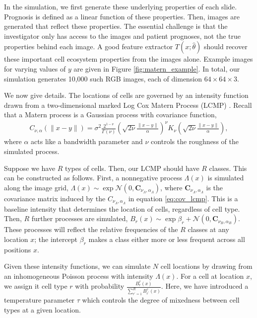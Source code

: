 In the simulation, we first generate these underlying properties of each slide.
Prognosis is defined as a linear function of these properties. Then, images are
generated that reflect these properties. The essential challenge is that the
investigator only has access to the images and patient prognoses, not the true
properties behind each image. A good feature extractor $T\left(x;
\hat{\theta}\right)$ should recover these important cell ecosystem properties
from the images alone. Example images for varying values of $y$ are given in
Figure \ref{fig:matern_example}. In total, our simulation generates 10,000 such
RGB images, each of dimension $64 \times 64 \times 3$.

We now give details. The locations of cells are governed by an intensity
function drawn from a two-dimensional marked Log Cox Matern Process (LCMP)
\cite{diggle2013spatial}. Recall that a Matern process is a Gaussian process
with covariance function,
\begin{align}
  \label{eq:cov_lcmp}
C_{\nu, \alpha}(\|x - y\|)=\sigma^{2} \frac{2^{1-\nu}}{\Gamma(\nu)}\left(\sqrt{2 \nu} \frac{\|x - y\|}{\alpha}\right)^{\nu} K_{\nu}\left(\sqrt{2 \nu} \frac{\|x - y\|}{\alpha}\right),
\end{align}
where $\alpha$ acts like a bandwidth parameter and $\nu$ controls the roughness
of the simulated process.

Suppose we have $R$ types of cells. Then, our LCMP should have $R$ classes. This
can be constructed as follows. First, a nonnegative process
$\Lambda\left(x\right)$ is simulated along the image grid,
$\Lambda\left(x\right) \sim \exp{\mathcal{N}\left(0, \mathbf{C}_{\nu_{\Lambda},
    \alpha_{\Lambda}}\right)}$, where $\mathbf{C}_{\nu_{\Lambda},
  \alpha_{\Lambda}}$ is the covariance matrix induced by the $C_{\nu_{\Lambda},
  \alpha_{\Lambda}}$ in equation \ref{eq:cov_lcmp}. This is a baseline intensity
that determines the location of cells, regardless of cell type. Then, $R$
further processes are simulated, $B_{r}\left(x\right) \sim \exp{\beta_{r} +
  \mathcal{N}\left(0, \mathbf{C}_{\nu_{B}, \alpha_{B}}\right)} $. These
processes will reflect the relative frequencies of the $R$ classes at any
location $x$; the intercept $\beta_r$ makes a class either more or less frequent
across all positions $x$.

Given these intensity functions, we can simulate $N$ cell locations by drawing
from an inhomogeneous Poisson process with intensity $\Lambda\left(x\right)$.
For a cell at location $x$, we assign it cell type $r$ with probability
$\frac{B_{r}^{\tau}\left(x\right)}{\sum_{r^\prime = 1}^{R}
  B^{\tau}_{r^\prime}\left(x\right)}$. Here, we have introduced a temperature
parameter $\tau$ which controls the degree of mixedness between cell types at a
given location.

